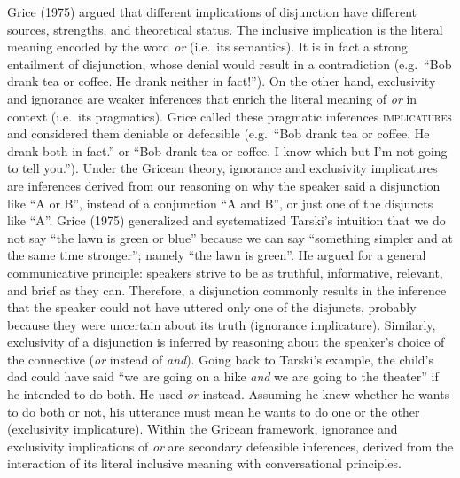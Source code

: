 \documentclass[
  english,
  ,man,floatsintext]{apa6}
\begin{document}
Grice (1975) argued that different implications of disjunction have different sources, strengths, and theoretical status. The inclusive implication is the literal meaning encoded by the word \emph{or} (i.e.~its semantics). It is in fact a strong entailment of disjunction, whose denial would result in a contradiction (e.g.~\enquote{Bob drank tea or coffee. He drank neither in fact!}). On the other hand, exclusivity and ignorance are weaker inferences that enrich the literal meaning of \emph{or} in context (i.e.~its pragmatics). Grice called these pragmatic inferences \textsc{implicatures} and considered them deniable or defeasible (e.g.~\enquote{Bob drank tea or coffee. He drank both in fact.} or \enquote{Bob drank tea or coffee. I know which but I'm not going to tell you.}). Under the Gricean theory, ignorance and exclusivity implicatures are inferences derived from our reasoning on why the speaker said a disjunction like \enquote{A or B}, instead of a conjunction \enquote{A and B}, or just one of the disjuncts like \enquote{A}. Grice (1975) generalized and systematized Tarski's intuition that we do not say \enquote{the lawn is green or blue} because we can say \enquote{something simpler and at the same time stronger}; namely \enquote{the lawn is green}. He argued for a general communicative principle: speakers strive to be as truthful, informative, relevant, and brief as they can. Therefore, a disjunction commonly results in the inference that the speaker could not have uttered only one of the disjuncts, probably because they were uncertain about its truth (ignorance implicature). Similarly, exclusivity of a disjunction is inferred by reasoning about the speaker's choice of the connective (\emph{or} instead of \emph{and}). Going back to Tarski's example, the child's dad could have said \enquote{we are going on a hike \emph{and} we are going to the theater} if he intended to do both. He used \emph{or} instead. Assuming he knew whether he wants to do both or not, his utterance must mean he wants to do one or the other (exclusivity implicature). Within the Gricean framework, ignorance and exclusivity implications of \emph{or} are secondary defeasible inferences, derived from the interaction of its literal inclusive meaning with conversational principles.
\end{document}

